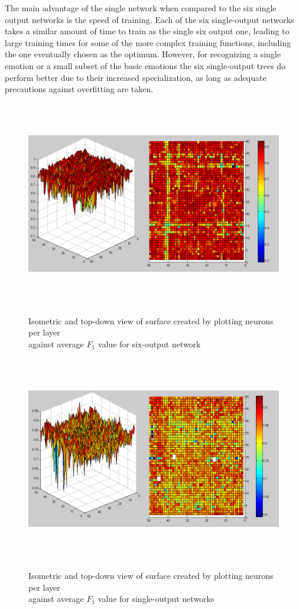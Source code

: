 \documentclass[a4paper]{article}
\begin{document}
The main advantage of the single network when compared to the six single output networks is the speed of training. Each of the six single-output 
networks takes a similar amount of time to train as the single six output one, leading to large training times for some of the more complex training
functions, including the one eventually chosen as the optimum. However, for recognizing a single emotion or a small subset of the basic emotions
the six single-output trees do perform better due to their increased specialization, as long as adequate precautions against overfitting are taken. 

\begin{figure}[p]
  \centering
  {\includegraphics[height=90mm]{6-out-topology.png}}
  \caption{Isometric and top-down view of surface created by plotting neurons per layer \\ against average $F_1$ value for six-output network}
\end{figure}

\begin{figure}[p]
  \centering
  {\includegraphics[height=90mm]{1-out-topology.png}}
  \caption{Isometric and top-down view of surface created by plotting neurons per layer \\ against average $F_1$ value for single-output networks}
\end{figure}
\end{document}

